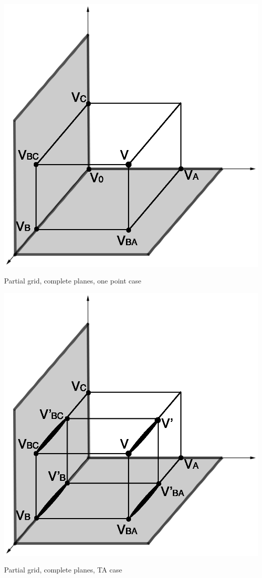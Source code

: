 \begin{multicols}{2}
{\begin{figurehere}
\begin{center}
\includegraphics[scale=0.40]{Interpolation-PLANE-INS.eps}
\caption{Partial grid, complete planes, one point case}
\label{figNCRPLANEINS}
\end{center}
\end{figurehere}

\begin{figurehere}
\begin{center}
\includegraphics[scale=0.40]{Interpolation-PLANE-TA.eps}
\caption{Partial grid, complete planes, TA case}
\label{figNCRPLANETA}
\end{center}
\end{figurehere}

}
\end{multicols}

